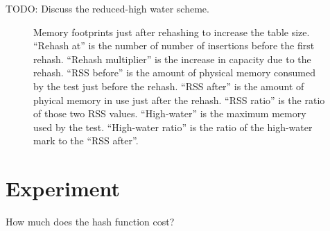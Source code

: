 \documentclass[10pt]{article}
\theoremstyle{remark}
\theoremstyle{remark}
\newcommand{\figlabel}[1]{\label{fig:#1}}
\begin{document}
TODO: Discuss the reduced-high water scheme.

\begin{figure}

\caption{Memory footprints just after rehashing to increase the table
  size.  ``Rehash at'' is the number of number of insertions before
  the first rehash.  ``Rehash multiplier'' is the increase in capacity
  due to the rehash.  ``RSS before'' is the amount of physical memory
  consumed by the test just before the rehash.  ``RSS after'' is the
  amount of phyical memory in use just after the rehash.  ``RSS
  ratio'' is the ratio of those two RSS values.  ``High-water'' is the
  maximum memory used by the test.  ``High-water ratio'' is the ratio
  of the high-water mark to the ``RSS after''.}  \figlabel{rss}
\end{figure}

\section{Experiment}

How much does the hash function cost?




\end{document}
